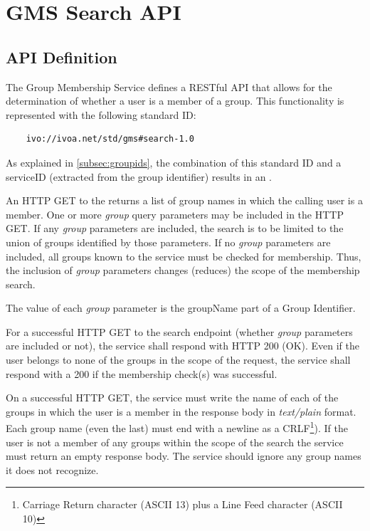 \documentclass[11pt,a4paper]{ivoa}
\begin{document}
\section{GMS Search API}

\subsection{API Definition}
\label{subsec:api}

The Group Membership Service defines a RESTful API \citep{fielding00} that allows for the determination of whether a user is a member of a group.  This functionality is represented with the following standard ID:

\begin{verbatim}
    ivo://ivoa.net/std/gms#search-1.0
\end{verbatim}

As explained in \ref{subsec:groupids}, the combination of this standard ID and a serviceID (extracted from the group identifier) results in an .

An HTTP GET to the  returns a list of group names in which the calling user is a member.  One or more \emph{group} query parameters may be included in the HTTP GET.  If any \emph{group} parameters are included, the search is to be limited to the union of groups identified by those parameters.  If no \emph{group} parameters are included, all groups known to the service must be checked for membership.  Thus, the inclusion of \emph{group} parameters changes (reduces) the scope of the membership search.

The value of each \emph{group} parameter is the groupName part of a Group Identifier.

For a successful HTTP GET to the search endpoint (whether \emph{group} parameters are included or not), the service shall respond with HTTP 200 (OK).  Even if the user belongs to none of the groups in the scope of the request, the service shall respond with a 200 if the membership check(s) was successful.

On a successful HTTP GET, the service must write the name of each of the groups in which the user is a member in the response body in \emph{text/plain} format.  Each group name (even the last) must end with a newline as a CRLF\footnote{Carriage Return character (ASCII 13) plus a Line Feed character (ASCII 10)}).  If the user is not a member of any groups within the scope of the search the service must return an empty response body.  The service should ignore any group names it does not recognize.
\end{document}

